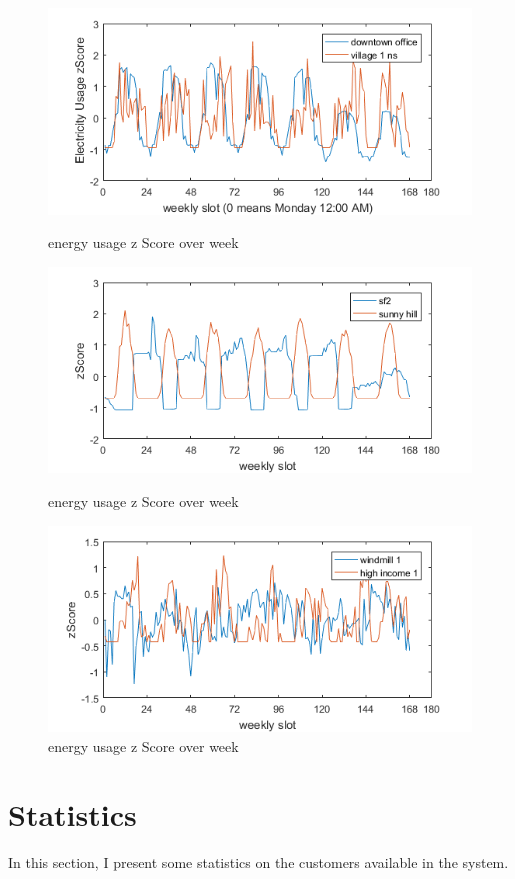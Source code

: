 \begin{figure}
\centering
\includegraphics[scale=0.85]{weekly1.png}
\caption{energy usage z Score over week}
\label{fig:weekly1}
\includegraphics[scale=0.85]{weekly2.png}
\caption{energy usage z Score over week}
\label{fig:weekly2}
\includegraphics[scale=0.85]{weekly3.png}
\caption{energy usage z Score over week}
\label{fig:weekly3}
\end{figure}


\section{Statistics}
In this section, I present some statistics on the customers available in the system. 

